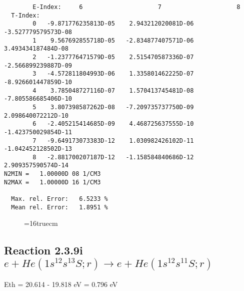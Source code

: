 \documentclass[12pt,dvipdfmx]{article}
\begin{document}
\begin{small}
\begin{verbatim}
        E-Index:     6                     7                     8
  T-Index:
        0   -9.871776235813D-05    2.943212020081D-06   -3.527779579573D-08
        1    9.567692855718D-05   -2.834877407571D-06    3.493434187484D-08
        2   -1.237776471579D-05    2.515470587336D-07   -2.566899239887D-09
        3   -4.572811804993D-06    1.335801462225D-07   -8.926601447859D-10
        4    3.785048727116D-07    1.570413745481D-08   -7.805586685406D-10
        5    3.807398587262D-08   -7.209735737750D-09    2.098640072212D-10
        6   -2.405215414685D-09    4.468725637555D-10   -1.423750029854D-11
        7   -9.649173073383D-12    1.030982426102D-11   -1.042452128502D-13
        8   -2.881700207187D-12   -1.158584840686D-12    2.909357590574D-14
N2MIN =   1.00000D 08 1/CM3
N2MAX =   1.00000D 16 1/CM3

  Max. rel. Error:   6.5233 %
  Mean rel. Error:   1.8951 %

\end{verbatim}\end{small}
\begin{figure} \label{2.3.9h}
\epsfxsize=16truecm
\end{figure}
\newpage



\subsection{
Reaction 2.3.9i $ e + He(1s^12s^13S;r) \rightarrow e + He(1s^12s^11S;r) $
}
Eth = 20.614 - 19.818 eV = 0.796 eV
\end{document}
